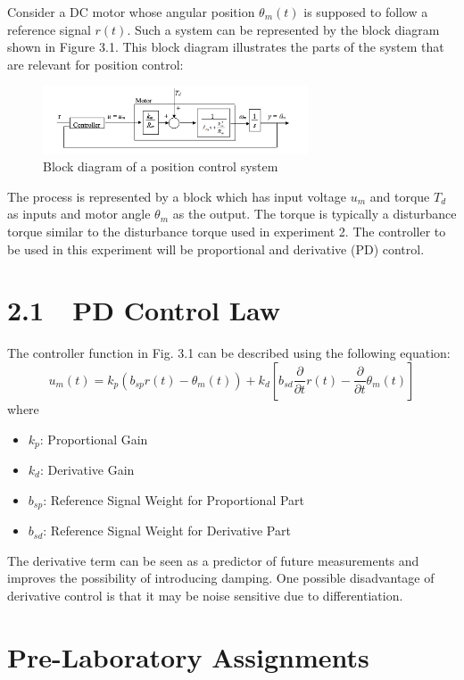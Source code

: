 \documentclass{article}
\begin{document}
Consider a DC motor whose angular position $\theta_m(t)$ is supposed to follow a reference signal $r(t)$. Such a system can be represented by the block diagram shown in Figure 3.1. This block diagram illustrates the parts of the system that are relevant for position control:

\begin{figure}[h]
    \centering
    \includegraphics[width=0.7\textwidth]{./block_diagram.png}
    \caption{Block diagram of a position control system}
\end{figure}

The process is represented by a block which has input voltage $u_m$ and torque $T_d$ as inputs and motor angle $\theta_m$ as the output. The torque is typically a disturbance torque similar to the disturbance torque used in experiment 2. The controller to be used in this experiment will be proportional and derivative (PD) control.

\section*{2.1\ \ PD Control Law}
The controller function in Fig. 3.1 can be described using the following equation:
\begin{equation}
    u_m(t) = k_p \left( b_{sp} r(t) - \theta_m(t) \right) + k_d \left[ b_{sd} \frac{\partial}{\partial t} r(t) - \frac{\partial}{\partial t} \theta_m(t) \right]
\end{equation}
where
\begin{itemize}
    \item $k_p$: Proportional Gain
    \item $k_d$: Derivative Gain
    \item $b_{sp}$: Reference Signal Weight for Proportional Part
    \item $b_{sd}$: Reference Signal Weight for Derivative Part
\end{itemize}

The derivative term can be seen as a predictor of future measurements and improves the possibility of introducing damping. One possible disadvantage of derivative control is that it may be noise sensitive due to differentiation.

\section{Pre-Laboratory Assignments}
\end{document}
